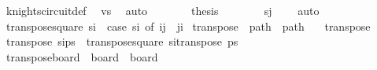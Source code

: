 \begin{isabellebody}
\ knights{\isacharunderscore}{\kern0pt}circuit{\isacharunderscore}{\kern0pt}def\ \isamarkupfalse%
\ vs\ \isamarkupfalse%
\ auto\isanewline
\ \ \ \ \isamarkupfalse%
\ \isamarkupfalse%
\ {\isacharquery}{\kern0pt}thesis\isanewline
\ \ \ \ \ \ \isamarkupfalse%
\ {\isacartoucheopen}s\isactrlsub j\ {\isacharequal}{\kern0pt}\ {\isacharparenleft}{\kern0pt}{}{\isacharcomma}{\kern0pt}{}{\isacharparenright}{\kern0pt}{\isacartoucheclose}\ \isamarkupfalse%
\ auto\isanewline
\ \ \isamarkupfalse%
\isanewline
{}\isamarkupfalse%
%
\endisatagproof
{\isafoldproof}%
%
\isadelimproof
%
\endisadelimproof
%
\isadelimdocument
%
\endisadelimdocument
%
\isatagdocument
%
\isamarkuptrue%
%
\isamarkuptrue%
%
\endisatagdocument
{\isafolddocument}%
%
\isadelimdocument
%
\endisadelimdocument
{}\isamarkupfalse%
\ {\isachardoublequoteopen}transpose{\isacharunderscore}{\kern0pt}square\ s\isactrlsub i\ {\isacharequal}{\kern0pt}\ {\isacharparenleft}{\kern0pt}case\ s\isactrlsub i\ of\ {\isacharparenleft}{\kern0pt}i{\isacharcomma}{\kern0pt}j{\isacharparenright}{\kern0pt}\ {\isasymRightarrow}\ {\isacharparenleft}{\kern0pt}j{\isacharcomma}{\kern0pt}i{\isacharparenright}{\kern0pt}{\isacharparenright}{\kern0pt}{\isachardoublequoteclose}\isanewline
\isanewline
{}\isamarkupfalse%
\ transpose\ {\isacharcolon}{\kern0pt}{\isacharcolon}{\kern0pt}\ {\isachardoublequoteopen}path\ {\isasymRightarrow}\ path{\isachardoublequoteclose}\ \isanewline
\ \ {\isachardoublequoteopen}transpose\ {\isacharbrackleft}{\kern0pt}{\isacharbrackright}{\kern0pt}\ {\isacharequal}{\kern0pt}\ {\isacharbrackleft}{\kern0pt}{\isacharbrackright}{\kern0pt}{\isachardoublequoteclose}\isanewline
{\isacharbar}{\kern0pt}\ {\isachardoublequoteopen}transpose\ {\isacharparenleft}{\kern0pt}s\isactrlsub i{\isacharhash}{\kern0pt}ps{\isacharparenright}{\kern0pt}\ {\isacharequal}{\kern0pt}\ {\isacharparenleft}{\kern0pt}transpose{\isacharunderscore}{\kern0pt}square\ s\isactrlsub i{\isacharparenright}{\kern0pt}{\isacharhash}{\kern0pt}transpose\ ps{\isachardoublequoteclose}\isanewline
\isanewline
{}\isamarkupfalse%
\ transpose{\isacharunderscore}{\kern0pt}board\ {\isacharcolon}{\kern0pt}{\isacharcolon}{\kern0pt}\ {\isachardoublequoteopen}board\ {\isasymRightarrow}\ board{\isachardoublequoteclose}\ \isanewline

\end{isabellebody}
